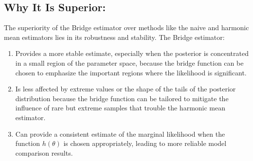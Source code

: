 \documentclass{article}
\begin{document}
\subsection{Why It Is Superior:}
The superiority of the Bridge estimator over methods like the naive and harmonic mean estimators lies in its robustness and stability. The Bridge estimator:
\begin{enumerate}
    \item Provides a more stable estimate, especially when the posterior is concentrated in a small region of the parameter space, because the bridge function can be chosen to emphasize the important regions where the likelihood is significant.
    \item Is less affected by extreme values or the shape of the tails of the posterior distribution because the bridge function can be tailored to mitigate the influence of rare but extreme samples that trouble the harmonic mean estimator.
    \item Can provide a consistent estimate of the marginal likelihood when the function \( h(\theta) \) is chosen appropriately, leading to more reliable model comparison results.
\end{enumerate}
\end{document}
